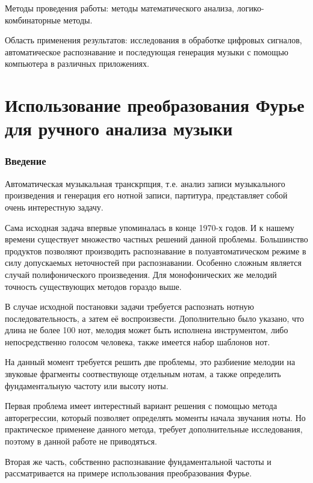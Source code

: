 \documentclass[oneside, final, 14pt]{extarticle}
\begin{document}
Методы проведения работы: методы математического анализа, логико-комбинаторные
методы.

Область применения результатов: исследования в обработке цифровых сигналов,
автоматическое распознавание и последующая генерация музыки с помощью
компьютера в различных приложениях.

\cleardoublepage


\tableofcontents
\cleardoublepage

\part{Использование преобразования Фурье для ручного анализа музыки}

\section{Введение}
  Автоматическая музыкальная транскрпция, т.е. анализ записи музыкального произведения
  и генерация его нотной записи, партитура, представляет собой очень интерестную задачу.

  Сама исходная задача впервые упоминалась в конце 1970-х годов. И к нашему времени
  существует множество частных решений данной проблемы. Большинство продуктов позволяют
  производить распознавание в полуавтоматическом режиме в силу допускаемых неточностей
  при распознавании. Особенно сложным является случай полифонического произведения.
  Для монофонических же мелодий точность существующих методов гораздо выше.

  В случае исходной постановки задачи требуется распознать нотную последовательность,
  а затем её воспроизвести. Дополнительно было указано, что длина не более 100 нот,
  мелодия может быть исполнена инструментом, либо непосредственно голосом человека,
  также имеется набор шаблонов нот.

  На данный момент требуется решить две проблемы, это разбиение мелодии на звуковые
  фрагменты соотвествующе отдельным нотам, а также определить фундаментальную частоту
  или высоту ноты.

  Первая проблема имеет интерестный вариант решения с помощью метода авторегрессии,
  который позволяет определять моменты начала звучания ноты. Но практическое
  применеие данного метода, требует дополнительные исследования, поэтому в данной
  работе не приводяться.

  Вторая же часть, собственно распознавание фундаментальной частоты и рассматривается
  на примере использования преобразования Фурье.
\end{document}
